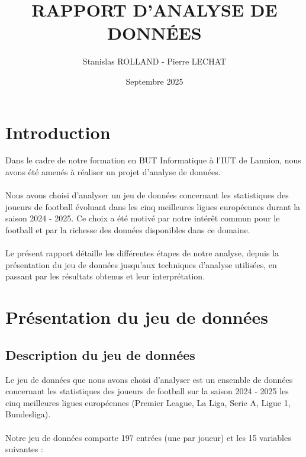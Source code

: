 \documentclass[11pt]{scrartcl}
\title{RAPPORT D'ANALYSE DE DONNÉES}
\author{Stanislas ROLLAND - Pierre LECHAT}
\date{Septembre 2025}
\begin{document}
    \maketitle
    \tableofcontents  
    \newpage
 


    \section{Introduction}

        Dans le cadre de notre formation en BUT Informatique à l'IUT de Lannion, nous avons été amenés à réaliser un projet d'analyse de données.\\\\
        Nous avons choisi d'analyser un jeu de données concernant les statistiques des joueurs de football évoluant dans les cinq meilleures ligues européennes durant la saison 2024 - 2025. Ce choix a été motivé par notre intérêt commun pour le football et par la richesse des données disponibles dans ce domaine.\\\\
        Le présent rapport détaille les différentes étapes de notre analyse, depuis la présentation du jeu de données jusqu'aux techniques d'analyse utilisées, en passant par les résultats obtenus et leur interprétation.



    \section{Présentation du jeu de données}

        \subsection{Description du jeu de données}
            Le jeu de données que nous avons choisi d'analyser est un ensemble de données concernant les statistiques des joueurs de football sur la saison 2024 - 2025 les cinq meilleures ligues européennes (Premier League, La Liga, Serie A, Ligue 1, Bundesliga).\\\\
            Notre jeu de données comporte 197 entrées (une par joueur) et les 15 variables suivantes :
\end{document}
